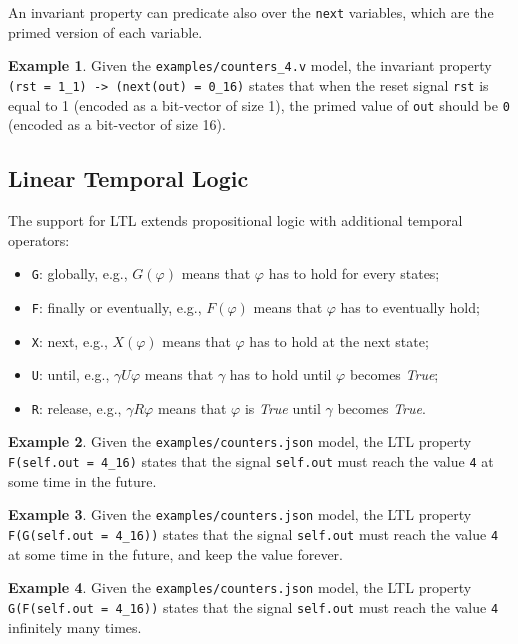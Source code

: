 \documentclass{article}
\theoremstyle{definition}
\newtheorem{example}{Example}[section]
\begin{document}
An invariant property can predicate also over the \texttt{next}
variables, which are the primed version of each variable.

\begin{example}
  Given the \texttt{examples/counters\_4.v} model, the invariant property
  \texttt{(rst = 1\_1) -> (next(out) = 0\_16)} states that when the reset
  signal \texttt{rst} is equal to 1 (encoded as a bit-vector of size
  {1}), the primed value of \texttt{out} should be \texttt{0} (encoded
  as a bit-vector of size {16}).
\end{example}

\subsection{Linear Temporal Logic}
The support for LTL extends propositional logic with additional
temporal operators:
\begin{itemize}
\item \texttt{G}: globally, e.g., $G(\varphi)$ means that $\varphi$
  has to hold for every states;
\item \texttt{F}: finally or eventually, e.g., $F(\varphi)$ means that $\varphi$
  has to eventually hold;
\item \texttt{X}: next, e.g., $X(\varphi)$ means that $\varphi$
  has to hold at the next state;
\item \texttt{U}: until, e.g., $\gamma U \varphi$ means that $\gamma$
  has to hold until $\varphi$ becomes \emph{True};
\item \texttt{R}: release, e.g., $\gamma R \varphi$ means that $\varphi$
  is \emph{True} until $\gamma$ becomes \emph{True}.
\end{itemize}

\begin{example}
  Given the \texttt{examples/counters.json} model, the LTL property
  \texttt{F(self.out = 4\_16)} states that the signal
  \texttt{self.out} must reach the value \texttt{4} at some time in
  the future.
\end{example}

\begin{example}
  Given the \texttt{examples/counters.json} model, the LTL property
  \texttt{F(G(self.out = 4\_16))} states that the signal
  \texttt{self.out} must reach the value \texttt{4} at some time in
  the future, and keep the value forever.
\end{example}

\begin{example}
  Given the \texttt{examples/counters.json} model, the LTL property
  \texttt{G(F(self.out = 4\_16))} states that the signal
  \texttt{self.out} must reach the value \texttt{4} infinitely many
  times.
\end{example}
\end{document}

